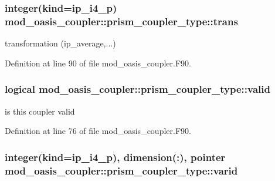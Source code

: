 \hypertarget{structmod__oasis__coupler_1_1prism__coupler__type_ad9fad1fec923d4db974f94fd0bca5697}{
\subsubsection[{trans}]{\setlength{\rightskip}{0pt plus 5cm}integer(kind=ip\+\_\+i4\+\_\+p) mod\+\_\+oasis\+\_\+coupler\+::prism\+\_\+coupler\+\_\+type\+::trans\hspace{0.3cm}{\ttfamily [private]}}}\label{structmod__oasis__coupler_1_1prism__coupler__type_ad9fad1fec923d4db974f94fd0bca5697}


transformation (ip\+\_\+average,...) 



Definition at line 90 of file mod\+\_\+oasis\+\_\+coupler.\+F90.

\hypertarget{structmod__oasis__coupler_1_1prism__coupler__type_aceee78ca0ec709406b404ff29e1fcf18}{
\subsubsection[{valid}]{\setlength{\rightskip}{0pt plus 5cm}logical mod\+\_\+oasis\+\_\+coupler\+::prism\+\_\+coupler\+\_\+type\+::valid\hspace{0.3cm}{\ttfamily [private]}}}\label{structmod__oasis__coupler_1_1prism__coupler__type_aceee78ca0ec709406b404ff29e1fcf18}


is this coupler valid 



Definition at line 76 of file mod\+\_\+oasis\+\_\+coupler.\+F90.

\hypertarget{structmod__oasis__coupler_1_1prism__coupler__type_a9e31592685ea4cb2da222187ee2ffa4b}{
\subsubsection[{varid}]{\setlength{\rightskip}{0pt plus 5cm}integer(kind=ip\+\_\+i4\+\_\+p), dimension(\+:), pointer mod\+\_\+oasis\+\_\+coupler\+::prism\+\_\+coupler\+\_\+type\+::varid\hspace{0.3cm}{\ttfamily [private]}}}\label{structmod__oasis__coupler_1_1prism__coupler__type_a9e31592685ea4cb2da222187ee2ffa4b}


